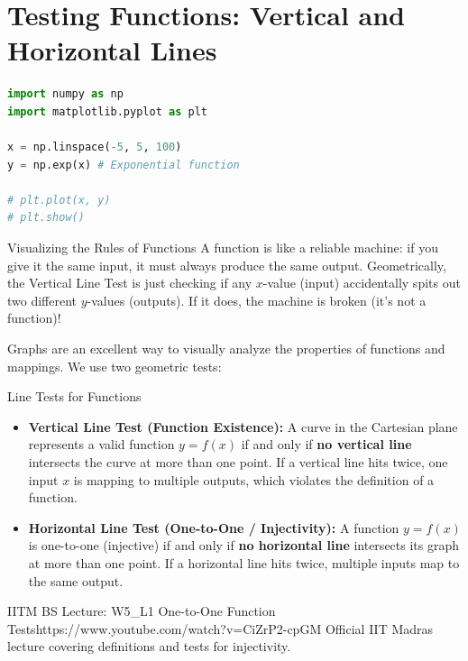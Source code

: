 \section{Testing Functions: Vertical and Horizontal Lines}

\begin{lstlisting}[language=Python, caption=Data Science: Plotting Functions]
import numpy as np
import matplotlib.pyplot as plt

x = np.linspace(-5, 5, 100)
y = np.exp(x) # Exponential function

# plt.plot(x, y)
# plt.show()
\end{lstlisting}


\begin{intuitionbox}{Visualizing the Rules of Functions}
A function is like a reliable machine: if you give it the same input, it must always produce the same output. Geometrically, the Vertical Line Test is just checking if any $x$-value (input) accidentally spits out two different $y$-values (outputs). If it does, the machine is broken (it's not a function)!
\end{intuitionbox}

Graphs are an excellent way to visually analyze the properties of functions and mappings. We use two geometric tests:

\begin{theorembox}{Line Tests for Functions}
\begin{itemize}
    \item \textbf{Vertical Line Test (Function Existence):} A curve in the Cartesian plane represents a valid function $y = f(x)$ if and only if \textbf{no vertical line} intersects the curve at more than one point. If a vertical line hits twice, one input $x$ is mapping to multiple outputs, which violates the definition of a function.
    \item \textbf{Horizontal Line Test (One-to-One / Injectivity):} A function $y = f(x)$ is one-to-one (injective) if and only if \textbf{no horizontal line} intersects its graph at more than one point. If a horizontal line hits twice, multiple inputs map to the same output.
\end{itemize}
\end{theorembox}

\begin{videocard}{IITM BS Lecture: W5\_L1 One-to-One Function Tests}{https://www.youtube.com/watch?v=CiZrP2-cpGM}
Official IIT Madras lecture covering definitions and tests for injectivity.
\end{videocard}

